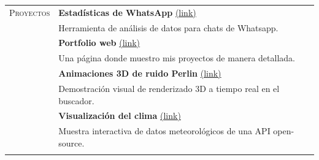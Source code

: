 \documentclass[11pt]{article}
\begin{document}
\begin{tabular}[t]{@{}p{30mm} @{}p{150mm}}
   {\scshape Proyectos}
                     &
   \textbf{Estadísticas de WhatsApp} \href{https://damiponce.github.io/chat-analyser/}{\small(link)}
   \\
                     &
   Herramienta de análisis de datos para chats de Whatsapp.
   \vspace{0.7\baselineskip}
   \\
                     & \textbf{Portfolio web} \href{https://damiponce.github.io/}{\small(link)}
   \\
                     & Una página donde muestro mis proyectos de manera detallada.
   \vspace{0.7\baselineskip}
   \\
                     & \textbf{Animaciones 3D de ruido Perlin} \href{https://damiponce.github.io/3d-noise/}{\small(link)}
   \\
                     & Demostración visual de renderizado 3D a tiempo real en el buscador.
   \vspace{0.7\baselineskip}
   \\
                     & \textbf{Visualización del clima} \href{https://damiponce.github.io/weather-web/}{\small(link)}
   \\
                     & Muestra interactiva de datos meteorológicos de una API open-source.
   \\
                     &
   \vspace{.3\baselineskip}
   {\noindent\hspace{-50mm}\hrulefill}
   \vspace{.7\baselineskip}
   \\


\end{tabular}
\end{document}
